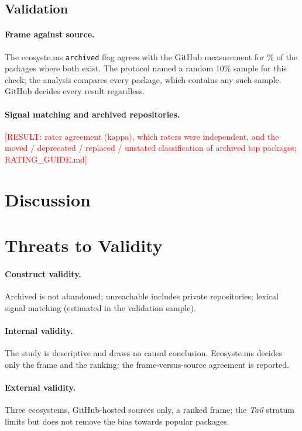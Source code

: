 \documentclass[11pt,a4paper]{article}
\newcommand{\result}[1]{\textcolor{red}{[RESULT: #1]}}
\newcommand{\code}[1]{\texttt{#1}}
\begin{document}
\subsection{Validation}
\label{sec:validation}

\paragraph{Frame against source.} The ecosyste.ms \code{archived} flag
agrees with the GitHub measurement for \% of the
 packages where both exist. The protocol named a random 10\%
sample for this check; the analysis compares every package, which
contains any such sample. GitHub decides every result regardless.

\paragraph{Signal matching and archived repositories.}
\result{rater agreement (kappa), which raters were independent, and the
moved / deprecated / replaced / unstated classification of archived top
packages; RATING\_GUIDE.md}

\section{Discussion}
\label{sec:discussion}

\section{Threats to Validity}
\label{sec:threats}
\paragraph{Construct validity.} Archived is not abandoned; unreachable
includes private repositories; lexical signal matching (estimated in the
validation sample).
\paragraph{Internal validity.} The study is descriptive and draws no
causal conclusion. Ecosyste.ms decides only the frame and the ranking;
the frame-versus-source agreement is reported.
\paragraph{External validity.} Three ecosystems, GitHub-hosted sources
only, a ranked frame; the \emph{Tail} stratum limits but does not remove
the bias towards popular packages.
\end{document}
